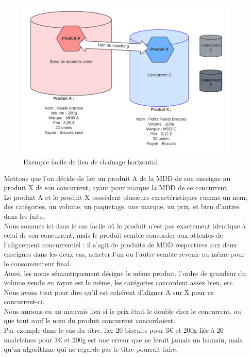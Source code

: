 \documentclass{rapportCS}
\begin{document}
\begin{figure}[h!]
  \centerline{\includegraphics[width=20cm]{images/Matching1.png}}
  \caption{\label{Matching1} Exemple facile de lien de chaînage horizontal}
  \end{figure}

Mettons que l'on décide de lier un produit A de la MDD de son enseigne au produit X de son concurrent,
ayant pour marque la MDD de ce concurrent.\\
Le produit A et le produit X possèdent plusieurs caractéristiques comme un nom, des catégories, un volume,
un paquetage, une marque, un prix, et bien d'autres dans les faits.\\
Nous sommes ici dans le cas facile où le produit n'est pas exactement identique à celui de son concurrent,
mais le produit semble concorder aux attentes de l'alignement concurrentiel : il s'agit de produits de MDD
respectives aux deux enseignes dans les deux cas, acheter l'un ou l'autre semble revenir au même pour le
consommateur final.\\
Aussi, les noms sémantiquement désigne le même produit, l'ordre de grandeur du volume 
vendu en rayon est le même, les catégories concordent assez bien, etc.
Nous avons tout pour dire qu'il est cohérent d'aligner A sur X pour ce concurrent-ci. \\

Nous aurions eu un mauvais lien si le prix était le double chez le concurrent, ou que tout 
sauf le nom du produit concurrent concordaient.\\
Par exemple dans le cas du titre, lier 20 biscuits pour 3€ et 200g liés à 20 madeleines pour 3€ et 200g 
est une erreur que ne ferait jamais un humain,
mais qu'un algorithme qui ne regarde pas le titre pourrait faire.  
\end{document}
